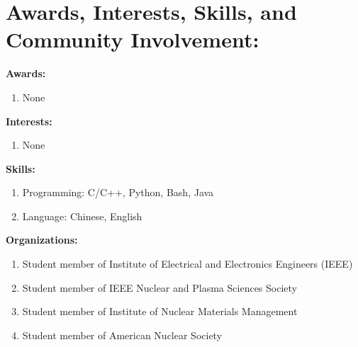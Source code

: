 \documentclass[letterpaper,11pt]{article} %
\begin{document}
\section{Awards, Interests, Skills, and Community Involvement:}
\hspace{1.5em}\textbf{Awards:}
 \begin{enumerate}[label={},nolistsep]
     \item None
\end{enumerate}
\hspace{1.5em}\textbf{Interests:}
 \begin{enumerate}[label={},nolistsep]
     \item None
\end{enumerate}
\hspace{1.5em}\textbf{Skills:}
 \begin{enumerate}[label={},nolistsep]
     \item {Programming}{: C/C++, Python, Bash, Java}
     \item {Language}{: Chinese, English}
\end{enumerate}
\hspace{1.5em}\textbf{Organizations:}
 \begin{enumerate}[label={},nolistsep]
    \item Student member of Institute of Electrical and Electronics Engineers (IEEE)
    \item Student member of IEEE Nuclear and Plasma Sciences Society
    \item Student member of Institute of Nuclear Materials Management
    \item Student member of American Nuclear Society
\end{enumerate}
\end{document}
